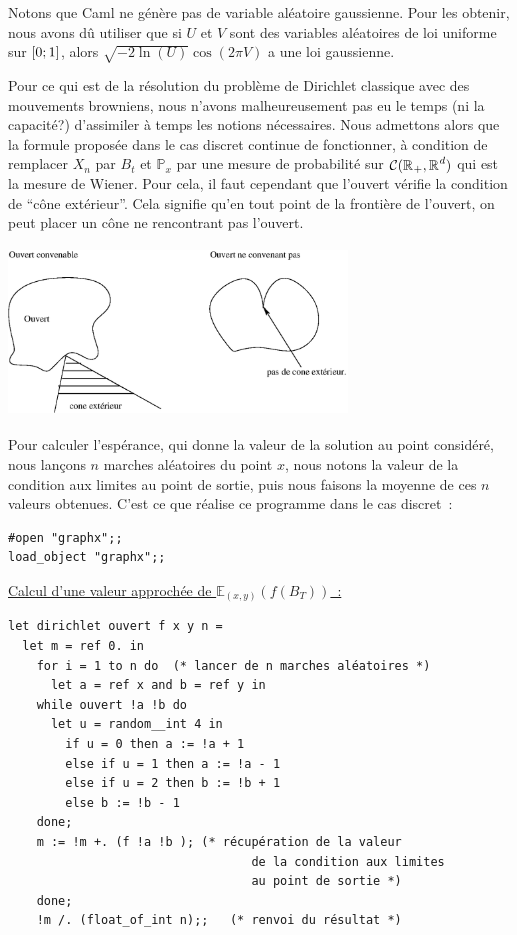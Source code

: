 Notons que Caml ne génère pas de variable aléatoire gaussienne. Pour les obtenir, nous avons dû utiliser que si $U$ et $V$ sont
des variables aléatoires de loi uniforme sur $[0;1]$, alors $\sqrt{-2\ln(U)}\cos(2\pi V)$ a une loi gaussienne.\par
Pour ce qui est de la résolution du problème de Dirichlet classique avec des mouvements browniens, nous n'avons malheureusement pas
eu le temps (ni la capacité?) d'assimiler à temps les notions nécessaires. Nous admettons alors que la formule proposée
dans le cas discret continue de fonctionner, à condition de remplacer
$X_n$ par $B_t$ et $\mathbb{P}_x$ par une mesure de probabilité sur
${\mathcal{C}}({\mathbb{R}^{}}_+,{\mathbb{R}^{}}^d)$ qui est la mesure de Wiener.
Pour cela, il faut cependant que l'ouvert vérifie la condition de ``cône extérieur''. Cela signifie qu'en tout point de la frontière 
de l'ouvert, on peut placer un cône ne rencontrant pas l'ouvert.\par
\centerline{\includegraphics*[width=9cm,height=4.5cm]{images/Ouverts.eps}}
Pour calculer l'espérance, qui donne la valeur de la solution au point
considéré, nous lançons $n$ marches aléatoires du point $x$, nous notons la valeur de la condition aux limites au point de sortie, puis nous faisons la moyenne de ces $n$ valeurs obtenues. C'est ce que réalise ce programme dans le cas discret~:\par
{\begin{verbatim}
#open "graphx";;
load_object "graphx";;
\end{verbatim}}\par
\uline{Calcul d'une valeur approchée de $\mathbb{E}_{(x,y)}(f(B_T))$~:}\par
{\begin{verbatim}
let dirichlet ouvert f x y n =
  let m = ref 0. in
    for i = 1 to n do  (* lancer de n marches aléatoires *)
      let a = ref x and b = ref y in
	while ouvert !a !b do
	  let u = random__int 4 in
	    if u = 0 then a := !a + 1
	    else if u = 1 then a := !a - 1
	    else if u = 2 then b := !b + 1
	    else b := !b - 1
	done;
	m := !m +. (f !a !b ); (* récupération de la valeur 
                                  de la condition aux limites
                                  au point de sortie *)
    done;
    !m /. (float_of_int n);;   (* renvoi du résultat *)
\end{verbatim}}\par
